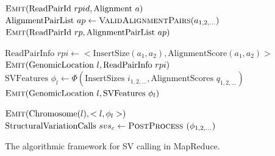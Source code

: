 \begin{algorithm}[h]
\algrenewcommand{}
 \begin{algorithmic}[1]
 \State $\textsc{Emit}(\textrm{ReadPairId }rpid, \textrm{Alignment }a)$
 \EndFor
 \EndFunction
 \State $\textrm{AlignmentPairList }ap \gets \textsc{ValidAlignmentPairs}(a_{1,2,\ldots})$
 \State $\textsc{Emit}(\textrm{ReadPairId }rp, \textrm{AlignmentPairList } ap)$
 \EndFunction
 \EndProcedure

 \State $ \textrm{ReadPairInfo }rpi \gets <\textrm{InsertSize}(a_1,a_2), \textrm{AlignmentScore}(a_1,a_2)>$
 \State $\textsc{Emit}(\textrm{GenomicLocation }l, \textrm{ReadPairInfo }rpi)$
 \EndFor
 \EndFor
 \EndFunction
 \State $\textrm{SVFeatures } \phi_l \gets \Phi(\textrm{InsertSizes }i_{1,2,\ldots}, \textrm{AlignmentScores }q_{1,2,\ldots})$
 \State $\textsc{Emit}(\textrm{GenomicLocation }l, \textrm{SVFeatures } \phi_l)$
 \EndFunction
 \EndProcedure

 \State $\textsc{Emit}(\textrm{Chromosome}(l), <l,\phi_l>)$
 \EndFunction
 \State $\textrm{StructuralVariationCalls } svs_c \gets \textsc{PostProcess }(\phi_{1,2,\ldots})$
 \EndFunction
 \EndProcedure
 \end{algorithmic}
\caption{The algorithmic framework for SV calling in MapReduce.}
\label{cb_algo}
\end{algorithm}
